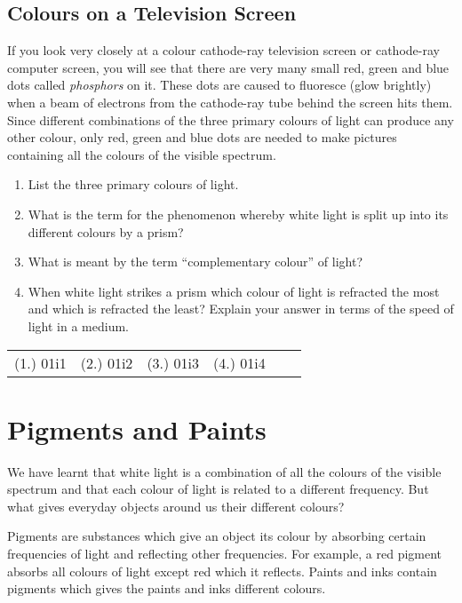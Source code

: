\subsection{Colours on a Television Screen}
If you look very closely at a colour cathode-ray television screen or cathode-ray computer screen, you will see that there are very many small red, green and blue dots called \textit{phosphors} on it. These dots are caused to fluoresce (glow brightly) when a beam of electrons from the cathode-ray tube behind the screen hits them. Since different combinations of the three primary colours of light can produce any other colour, only red, green and blue dots are needed to make pictures containing all the colours of the visible spectrum.

{
\begin{enumerate}
\item List the three primary colours of light.
\item What is the term for the phenomenon whereby white light is split up into its different colours by a prism?
\item What is meant by the term ``complementary colour'' of light?
\item When white light strikes a prism which colour of light is refracted the most and which is refracted the least? Explain your answer in terms of the speed of light in a medium.
\end{enumerate}

\par \practiceinfo
\par \begin{tabular}[h]{cccccc}
(1.)	01i1	&
(2.)	01i2	&
(3.)	01i3	&
(4.)	01i4	&
\end{tabular}
}


\section{Pigments and Paints}

We have learnt that white light is a combination of all the colours of the visible spectrum and that each colour of light is related to a different frequency. But what gives everyday objects around us their different colours? 

Pigments are substances which give an object its colour by absorbing certain frequencies of light and reflecting other frequencies. For example, a red pigment absorbs all colours of light except red which it reflects. Paints and inks contain pigments which gives the paints and inks different colours. 



